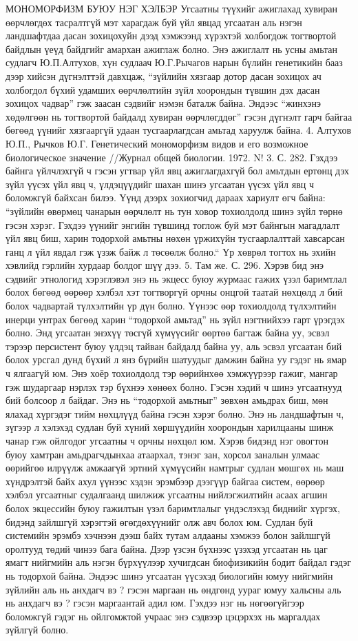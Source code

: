 МОНОМОРФИЗМ БУЮУ НЭГ ХЭЛБЭР
Угсаатны түүхийг ажиглахад хувиран өөрчлөгдөх тасралтгүй мэт харагдаж буй үйл явцад угсаатан аль нэгэн ландшафтдаа дасан зохицохуйн дээд хэмжээнд хүрэхтэй холбогдож тогтвортой байдлын үеүд байдгийг амархан ажиглаж болно. Энэ ажиглалт нь усны амьтан судлагч Ю.П.Алтухов, хүн судлаач Ю.Г.Рычагов нарын бүлийн генетикийн бааз дээр хийсэн дүгнэлттэй давхцаж, “зүйлийн хязгаар дотор дасан зохицох ач холбогдол бүхий удамших өөрчлөлтийн зүйл хоорондын түвшин дэх дасан зохицох чадвар” гэж заасан сэдвийг нэмэн баталж байна. Эндээс “жинхэнэ хөдөлгөөн нь тогтвортой байдалд хувиран өөрчлөгддөг” гэсэн дүгнэлт гарч байгаа бөгөөд үүнийг хязгааргүй удаан тусгаарлагдсан амьтад харуулж байна. 4. Алтухов Ю.П., Рычков Ю.Г. Генетический мономорфизм видов и его возможное биологическое значение //Журнал общей биологии. 1972. N! 3. С. 282.
Гэхдээ байнга үйлчлэхгүй ч гэсэн угтвар үйл явц ажиглагдахгүй бол амьтдын ертөнц дэх зүйл үүсэх үйл явц ч, үлдэцүүдийг шахан шинэ угсаатан үүсэх үйл явц ч боломжгүй байхсан билээ. Үүнд дээрх зохиогчид дараах хариулт өгч байна: “зүйлийн өвөрмөц чанарын өөрчлөлт нь тун ховор тохиолдолд шинэ зүйл төрнө гэсэн хэрэг. Гэхдээ үүнийг энгийн түвшинд тоглож буй мэт байнгын магадлалт үйл явц биш, харин тодорхой амьтны нөхөн үржихүйн тусгаарлалттай хавсарсан ганц л үйл явдал гэж үзэж байж л төсөөлж болно.“ Үр хөврөл тогтох нь эхийн хэвлийд гэрлийн хурдаар болдог шүү дээ. 5. Там же. С. 296.
Хэрэв бид энэ сэдвийг этнологид хэрэглэвэл энэ нь экцесс буюу журмаас гажих үзэл баримтлал болох бөгөөд өөрөөр хэлбэл хэт тогтворгүй орчны онцгой таатай нөхцөлд л бий болох чадвартай түлхэлтийн үр дүн болно. Үүнээс өөр тохиолдолд түлхэлтийн инерци унтрах бөгөөд харин “тодорхой амьтад” нь зүйл нэгтнийхээ гарт үрэгдэх болно. Энд угсаатан энэхүү төсгүй хүмүүсийг өөртөө багтаж байна уу, эсвэл тэрээр персистент буюу үлдэц тайван байдалд байна уу, аль эсвэл угсаатан бий болох урсгал дунд бүхий л янз бүрийн шатуудыг дамжин байна уу гэдэг нь ямар ч ялгаагүй юм. Энэ хоёр тохиолдолд тэр өөрийнхөө хэмжүүрээр гажиг, мангар гэж шударгаар нэрлэх тэр бүхнээ хөнөөх болно. Гэсэн хэдий ч шинэ угсаатнууд бий болсоор л байдаг. Энэ нь “тодорхой амьтныг” зөвхөн амьдрах биш, мөн ялахад хүргэдэг тийм нөхцлүүд байна гэсэн хэрэг болно. Энэ нь ландшафтын ч, зүгээр л хэлэхэд судлан буй хүний хөршүүдийн хоорондын харилцааны шинж чанар гэж ойлгодог угсаатны ч орчны нөхцөл юм. Хэрэв бидэнд нэг овогтон буюу хамтран амьдрагчдынхаа атаархал, тэнэг зан, хорсол заналын улмаас өөрийгөө илрүүлж амжаагүй эртний хүмүүсийн намтрыг судлан мөшгөх нь маш хүндрэлтэй байх ахул үүнээс хэдэн эрэмбээр дээгүүр байгаа систем, өөрөөр хэлбэл угсаатныг судалгаанд шилжиж угсаатны нийлэгжилтийн асаах агшин болох экцессийн буюу гажилтын үзэл баримтлалыг үндэслэхэд биднийг хүргэх, бидэнд зайлшгүй хэрэгтэй өгөгдөхүүнийг олж авч болох юм. Судлан буй системийн эрэмбэ хэчнээн дээш байх тутам алдааны хэмжээ болон зайлшгүй оролтууд төдий чинээ бага байна. Дээр үзсэн бүхнээс үзэхэд угсаатан нь цаг ямагт нийгмийн аль нэгэн бүрхүүлээр хучигдсан биофизикийн бодит байдал гэдэг нь тодорхой байна. Эндээс шинэ угсаатан үүсэхэд биологийн юмуу нийгмийн зүйлийн аль нь анхдагч вэ ? гэсэн маргаан нь өндгөнд уураг юмуу хальсны аль нь анхдагч вэ ? гэсэн маргаантай адил юм. Гэхдээ нэг нь нөгөөгүйгээр боломжгүй гэдэг нь ойлгомжтой учраас энэ сэдвээр цэцэрхэх нь маргалдах зүйлгүй болно.
